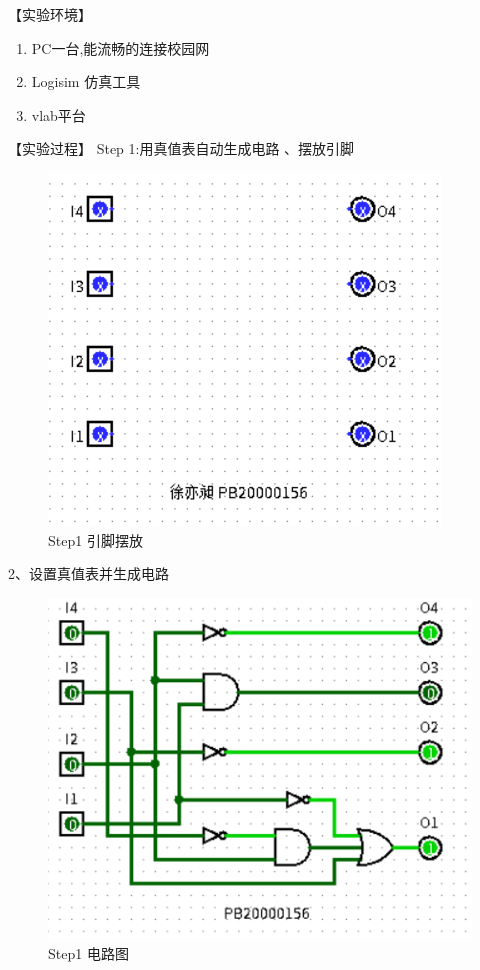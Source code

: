 \documentclass[UTF8]{ctexart}
\begin{document}
\newline
【实验环境】
\newline
\begin{enumerate}
    \item PC一台,能流畅的连接校园网
    \item Logisim 仿真工具
    \item vlab平台
\end{enumerate}
【实验过程】
\newline
Step 1:用真值表自动生成电路
、摆放引脚
\newline
\begin{figure}[h!]
    \centering
    \includegraphics{S1_1.PNG}
    \caption{Step1 引脚摆放}
\end{figure}
2、设置真值表并生成电路
\newline
\begin{figure}[h!]
    \centering
    \includegraphics{S1_2.PNG}
    \caption{Step1 电路图}
\end{figure}
\end{document}
